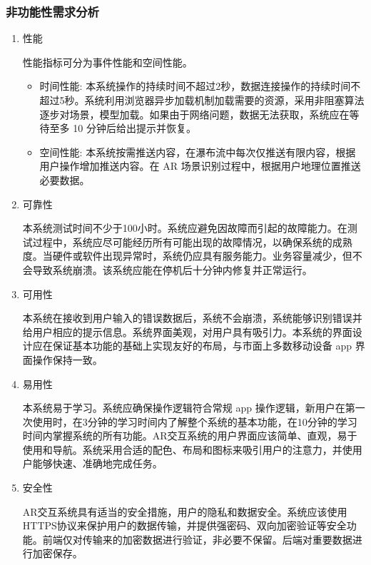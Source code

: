 \subsubsection{非功能性需求分析}

\begin{enumerate}
  \item 性能
  
  性能指标可分为事件性能和空间性能。
  \begin{itemize}
    \item 时间性能: 本系统操作的持续时间不超过2秒，数据连接操作的持续时间不超过5秒。系统利用浏览器异步加载机制加载需要的资源，采用非阻塞算法逐步对场景，模型加载。如果由于网络问题，数据无法获取，系统应在等待至多 10 分钟后给出提示并恢复。
    \item 空间性能: 本系统按需推送内容，在瀑布流中每次仅推送有限内容，根据用户操作增加推送内容。在 AR 场景识别过程中，根据用户地理位置推送必要数据。
  \end{itemize}

  \item 可靠性
  
  本系统测试时间不少于100小时。系统应避免因故障而引起的故障能力。在测试过程中，系统应尽可能经历所有可能出现的故障情况，以确保系统的成熟度。当硬件或软件出现异常时，系统仍应具有服务能力。业务容量减少，但不会导致系统崩溃。该系统应能在停机后十分钟内修复并正常运行。

  \item 可用性

  本系统在接收到用户输入的错误数据后，系统不会崩溃，系统能够识别错误并给用户相应的提示信息。系统界面美观，对用户具有吸引力。本系统的界面设计应在保证基本功能的基础上实现友好的布局，与市面上多数移动设备 app 界面操作保持一致。
  
  \item 易用性
  
  本系统易于学习。系统应确保操作逻辑符合常规 app 操作逻辑，新用户在第一次使用时，在3分钟的学习时间内了解整个系统的基本功能，在10分钟的学习时间内掌握系统的所有功能。AR交互系统的用户界面应该简单、直观，易于使用和导航。系统采用合适的配色、布局和图标来吸引用户的注意力，并使用户能够快速、准确地完成任务。

  \item 安全性
  
  AR交互系统具有适当的安全措施，用户的隐私和数据安全。系统应该使用HTTPS协议来保护用户的数据传输，并提供强密码、双向加密验证等安全功能。前端仅对传输来的加密数据进行验证，非必要不保留。后端对重要数据进行加密保存。


\end{enumerate}
